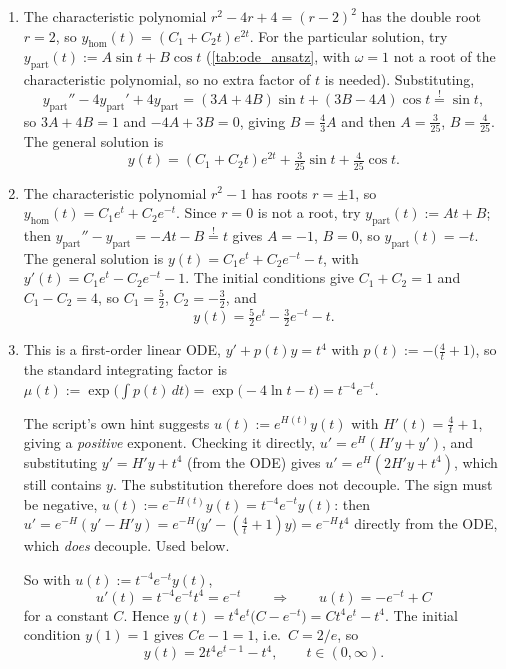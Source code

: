 \begin{exercisesolution}
\begin{enumerate}[label=\textbf{(\alph*)}]
  \item The characteristic polynomial $r^2-4r+4=(r-2)^2$ has the double root $r=2$, so
    $y_{\mathrm{hom}}(t) = (C_1+C_2t)e^{2t}$. For the particular solution, try
    $y_{\mathrm{part}}(t) := A\sin t+B\cos t$ (\cref{tab:ode_ansatz}, with $\omega=1$ not a root
    of the characteristic polynomial, so no extra factor of $t$ is needed). Substituting,
    \[y_{\mathrm{part}}''-4y_{\mathrm{part}}'+4y_{\mathrm{part}}
      = (3A+4B)\sin t + (3B-4A)\cos t \overset{!}{=} \sin t,\]
    so $3A+4B=1$ and $-4A+3B=0$, giving $B=\tfrac43A$ and then $A=\tfrac{3}{25}$,
    $B=\tfrac{4}{25}$. The general solution is
    \[y(t) = (C_1+C_2t)e^{2t} + \tfrac{3}{25}\sin t + \tfrac{4}{25}\cos t.\]

  \item The characteristic polynomial $r^2-1$ has roots $r=\pm1$, so
    $y_{\mathrm{hom}}(t) = C_1e^t+C_2e^{-t}$. Since $r=0$ is not a root, try
    $y_{\mathrm{part}}(t) := At+B$; then $y_{\mathrm{part}}''-y_{\mathrm{part}} = -At-B
    \overset{!}{=} t$ gives $A=-1$, $B=0$, so $y_{\mathrm{part}}(t) = -t$. The general solution is
    $y(t) = C_1e^t+C_2e^{-t}-t$, with $y'(t) = C_1e^t-C_2e^{-t}-1$. The initial conditions give
    $C_1+C_2=1$ and $C_1-C_2=4$, so $C_1=\tfrac52$, $C_2=-\tfrac32$, and
    \[y(t) = \tfrac52e^t - \tfrac32e^{-t} - t.\]

  \item This is a first-order linear ODE, $y'+p(t)y=t^4$ with
    $p(t) := -\big(\tfrac4t+1\big)$, so the standard integrating factor is
    $\mu(t) := \exp\!\big(\int p(t)\,dt\big) = \exp\big(-4\ln t - t\big) = t^{-4}e^{-t}$.

    \begin{ainote}
    The script's own hint suggests $u(t):=e^{H(t)}y(t)$ with $H'(t)=\tfrac4t+1$, giving a
    \emph{positive} exponent. Checking it directly, $u' = e^H(H'y+y')$, and substituting
    $y'=H'y+t^4$ (from the ODE) gives $u' = e^H(2H'y+t^4)$, which still contains $y$. The
    substitution therefore does not decouple. The
    sign must be negative, $u(t) := e^{-H(t)}y(t) = t^{-4}e^{-t}y(t)$: then
    $u' = e^{-H}(y'-H'y) = e^{-H}\big(y'-(\tfrac4t+1)y\big) = e^{-H}t^4$ directly from the ODE,
    which \emph{does} decouple. Used below.
    \end{ainote}

    So with $u(t) := t^{-4}e^{-t}y(t)$,
    \[u'(t) = t^{-4}e^{-t}t^4 = e^{-t} \qquad\Longrightarrow\qquad u(t) = -e^{-t}+C\]
    for a constant $C$. Hence $y(t) = t^4e^t\big(C-e^{-t}\big) = Ct^4e^t - t^4$. The initial
    condition $y(1)=1$ gives $Ce-1=1$, i.e.\ $C = 2/e$, so
    \[y(t) = 2t^4e^{t-1} - t^4, \qquad t \in (0,\infty).\]
\end{enumerate}
\end{exercisesolution}

